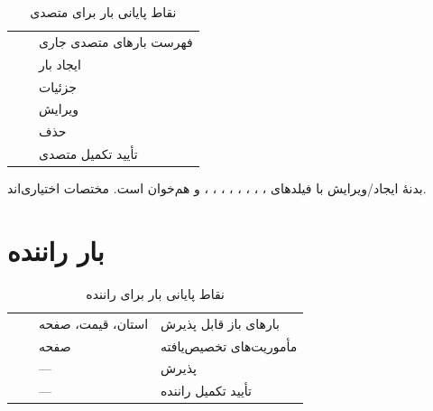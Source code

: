 \begin{table}[ht]
\centering
\caption{نقاط پایانی بار برای متصدی}
\label{tab:api-operator}
\begin{tabularx}{\textwidth}{@{}c >{\raggedleft\arraybackslash}p{} Y@{}}
\toprule
{} &  &  \\
\midrule
{} &  & فهرست بارهای متصدی جاری \\
 &  & ایجاد بار \\
 &  & جزئیات \\
 &  & ویرایش \\
 &  & حذف \\
 &  & تأیید تکمیل متصدی \\
\bottomrule
\end{tabularx}
\end{table}

بدنهٔ ایجاد/ویرایش با فیلدهای ، ، ، ، ، ، ، ،  و  هم‌خوان است. مختصات اختیاری‌اند.

\section{بار راننده}

\begin{table}[ht]
\centering
\caption{نقاط پایانی بار برای راننده}
\label{tab:api-driver}
\begin{tabularx}{\textwidth}{@{}c >{\raggedright\arraybackslash}p{} Y Y@{}}
\toprule
{} &  &  &  \\
\midrule
{} &  & استان، قیمت، صفحه & بارهای باز قابل پذیرش \\
 &  & صفحه & مأموریت‌های تخصیص‌یافته \\
 &  & --- & پذیرش \\
 &  & --- & تأیید تکمیل راننده \\
\bottomrule
\end{tabularx}
\end{table}

